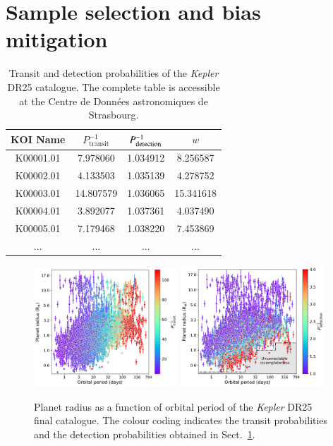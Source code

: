 \documentclass[]{aa}
\begin{document}
 
\section{Sample selection and bias mitigation}
\label{sec:sample_selection_biases_mitigation}

\begin{table}[]
\renewcommand{\arraystretch}{1.3}
\setlength{\tabcolsep}{11pt}
\caption{Transit and detection probabilities of the \textit{Kepler} DR25 catalogue. The complete table is accessible at the Centre de Données astronomiques de Strasbourg.}
\label{tab:weights}
\begin{tabular}{cccc}
\hline \hline
KOI Name        & $P_{\textrm{transit}}^{-1}$ & $P_{\rm detection}^{-1}$ & $w$   \\ \hline
K00001.01    & 7.978060                      & 1.034912              & 8.256587   \\
K00002.01          & 4.133503                        & 1.035139              & 4.278752  \\
K00003.01 & 14.807579                        & 1.036065              & 15.341618  \\
        K00004.01  & 3.892077                    & 1.037361              & 4.037490  \\
K00005.01  & 7.179468                     & 1.038220             & 7.453869\\
...           & ...                         & ...                 & ...     \\ \hline
\end{tabular}
\end{table}

\begin{figure}
    \centering
    \includegraphics[width=0.48\textwidth]{tr_prob.pdf}
    \includegraphics[width=0.48\textwidth]{detect_prob.pdf}
    \caption{Planet radius as a function of orbital period of the \textit{Kepler} DR25 final catalogue. The colour coding indicates the transit probabilities and the detection probabilities obtained in Sect.~\ref{sec:sample_selection_biases_mitigation}.}
    \label{fig:probs}
\end{figure}
\end{document}
